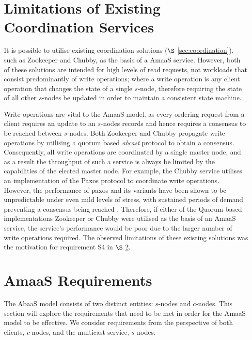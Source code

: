 \section{Limitations of Existing Coordination Services}\label{sec:limitations_existing_coordination}
It is possible to utilise existing coordination solutions ($\S$ \ref{sec:coordination}), such as Zookeeper\citep{Hunt:2010:ZWC:1855840.1855851} and Chubby\citep{Burrows:2006:CLS:1298455.1298487}, as the basis of a \textsf{AmaaS} service.  However, both of these solutions are intended for high levels of read requests, not workloads that consist predominantly of write operations; where a write operation is any client operation that changes the state of a single $s$-node, therefore requiring the state of all other $s$-nodes be updated in order to maintain a consistent state machine.  

Write operations are vital to the \textsf{AmaaS} model, as every ordering request from a client requires an update to an $s$-nodes records and hence requires a consensus to be reached between $s$-nodes.  Both Zookeeper and Chubby propagate write operations by utilising a quorum based \emph{abcast} protocol to obtain a consensus.  Consequently, all write operations are coordinated by a single master node, and as a result the throughput of such a service is always be limited by the capabilities of the elected master node.  For example, the Chubby service utilises an implementation of the Paxos protocol to coordinate write operations.  However, the performance of paxos and its variants have been shown to be unpredictable under even mild levels of stress, with sustained periods of demand preventing a consensus being reached \citep{DBLP:journals/corr/MarandiBPB14}.  Therefore, if either of the Quorum based implementations Zookeeper or Chubby were utilised as the basis of an \textsf{AmaaS} service, the service's performance would be poor due to the larger number of write operations required.  The observed limitations of these existing solutions was the motivation for requirement S4 in $\S$ \ref{sec:absaas_requirements}.  	
	
\section{AmaaS Requirements}\label{sec:absaas_requirements}
The \textsf{AbaaS} model consists of two distinct entities: $s$-nodes and $c$-nodes.  This section will explore the requirements that need to be met in order for the \textsf{AmaaS} model to be effective.  We consider requirements from the perspective of both clients, $c$-nodes, and the multicast service, $s$-nodes.

